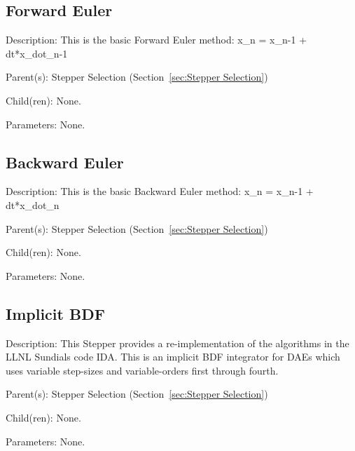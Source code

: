 \subsection{Forward Euler}
\label{sec:Forward Euler}

\begin{list}{}
  {\setlength{\leftmargin}{1.0in}
   \setlength{\labelwidth}{0.75in}
   \setlength{\labelsep}{0.125in}}
  \item[Description:]
    This is the basic Forward Euler method: x\_n = x\_{n-1} + dt*x\_dot\_{n-1}
  \item[Parent(s):]
    Stepper Selection (Section~\ref{sec:Stepper Selection})
  \item[Child(ren):]
    None. 
  \item[Parameters:]
    None. 
\end{list}

\subsection{Backward Euler}
\label{sec:Backward Euler}

\begin{list}{}
  {\setlength{\leftmargin}{1.0in}
   \setlength{\labelwidth}{0.75in}
   \setlength{\labelsep}{0.125in}}
  \item[Description:]
    This is the basic Backward Euler method: x\_n = x\_{n-1} + dt*x\_dot\_n
  \item[Parent(s):]
    Stepper Selection (Section~\ref{sec:Stepper Selection})
  \item[Child(ren):]
    None. 
  \item[Parameters:]
    None. 
\end{list}

\subsection{Implicit BDF}
\label{sec:Implicit BDF}

\begin{list}{}
  {\setlength{\leftmargin}{1.0in}
   \setlength{\labelwidth}{0.75in}
   \setlength{\labelsep}{0.125in}}
  \item[Description:]
    This Stepper provides a re-implementation of the algorithms in the LLNL Sundials code IDA. This is an implicit BDF integrator for DAEs which uses variable step-sizes and variable-orders first through fourth.
  \item[Parent(s):]
    Stepper Selection (Section~\ref{sec:Stepper Selection})
  \item[Child(ren):]
    None. 
  \item[Parameters:]
    None. 
\end{list}

